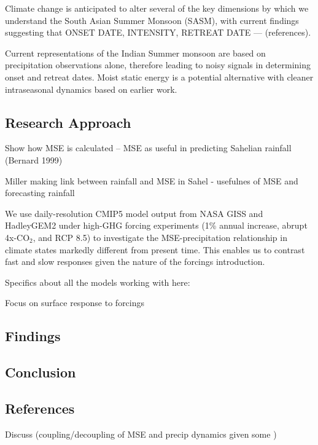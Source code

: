 \documentclass[11pt,reqno]{amsart}
\begin{document}
Climate change is anticipated to alter several of the key dimensions by which we understand the South Asian Summer Monsoon (SASM), with current findings suggesting that ONSET DATE, INTENSITY, RETREAT DATE --- (references).  

Current representations of the Indian Summer monsoon are based on precipitation observations alone, therefore leading to noisy signals in determining onset and retreat dates.  Moist static energy is a potential alternative with cleaner intraseasonal dynamics based on earlier work.  

\subsection{Research Approach}

Show how MSE is calculated --   MSE as useful in predicting Sahelian rainfall (Bernard 1999) 

Miller making link between rainfall and MSE in Sahel - usefulnes of MSE and forecasting rainfall 

We use daily-resolution CMIP5 model output from NASA GISS and HadleyGEM2 under high-GHG forcing experiments (1\% annual increase, abrupt 4x-CO$_2$, and RCP 8.5) to investigate the MSE-precipitation relationship in climate states markedly different from present time.  This enables us to contrast fast and slow responses given the nature of the forcings introduction.  

Specifics about all the models working with here:  

Focus on surface response to forcings 

\subsection{Findings}


\subsection{Conclusion}


\subsection{References}





Discuss (coupling/decoupling of MSE and precip dynamics given some )  
\end{document}
